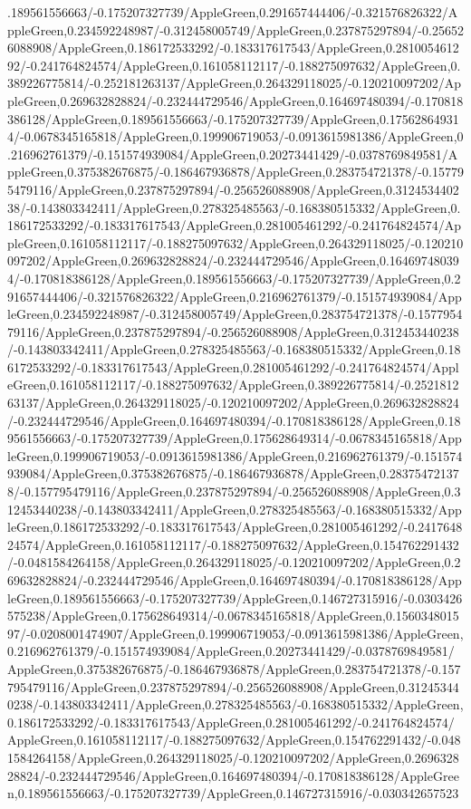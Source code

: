 {\begin{tikzternal}
{.189561556663/-0.175207327739/AppleGreen,0.291657444406/-0.321576826322/AppleGreen,0.234592248987/-0.312458005749/AppleGreen,0.237875297894/-0.256526088908/AppleGreen,0.186172533292/-0.183317617543/AppleGreen,0.281005461292/-0.241764824574/AppleGreen,0.161058112117/-0.188275097632/AppleGreen,0.389226775814/-0.252181263137/AppleGreen,0.264329118025/-0.120210097202/AppleGreen,0.269632828824/-0.232444729546/AppleGreen,0.164697480394/-0.170818386128/AppleGreen,0.189561556663/-0.175207327739/AppleGreen,0.175628649314/-0.0678345165818/AppleGreen,0.199906719053/-0.0913615981386/AppleGreen,0.216962761379/-0.151574939084/AppleGreen,0.20273441429/-0.0378769849581/AppleGreen,0.375382676875/-0.186467936878/AppleGreen,0.283754721378/-0.157795479116/AppleGreen,0.237875297894/-0.256526088908/AppleGreen,0.312453440238/-0.143803342411/AppleGreen,0.278325485563/-0.168380515332/AppleGreen,0.186172533292/-0.183317617543/AppleGreen,0.281005461292/-0.241764824574/AppleGreen,0.161058112117/-0.188275097632/AppleGreen,0.264329118025/-0.120210097202/AppleGreen,0.269632828824/-0.232444729546/AppleGreen,0.164697480394/-0.170818386128/AppleGreen,0.189561556663/-0.175207327739/AppleGreen,0.291657444406/-0.321576826322/AppleGreen,0.216962761379/-0.151574939084/AppleGreen,0.234592248987/-0.312458005749/AppleGreen,0.283754721378/-0.157795479116/AppleGreen,0.237875297894/-0.256526088908/AppleGreen,0.312453440238/-0.143803342411/AppleGreen,0.278325485563/-0.168380515332/AppleGreen,0.186172533292/-0.183317617543/AppleGreen,0.281005461292/-0.241764824574/AppleGreen,0.161058112117/-0.188275097632/AppleGreen,0.389226775814/-0.252181263137/AppleGreen,0.264329118025/-0.120210097202/AppleGreen,0.269632828824/-0.232444729546/AppleGreen,0.164697480394/-0.170818386128/AppleGreen,0.189561556663/-0.175207327739/AppleGreen,0.175628649314/-0.0678345165818/AppleGreen,0.199906719053/-0.0913615981386/AppleGreen,0.216962761379/-0.151574939084/AppleGreen,0.375382676875/-0.186467936878/AppleGreen,0.283754721378/-0.157795479116/AppleGreen,0.237875297894/-0.256526088908/AppleGreen,0.312453440238/-0.143803342411/AppleGreen,0.278325485563/-0.168380515332/AppleGreen,0.186172533292/-0.183317617543/AppleGreen,0.281005461292/-0.241764824574/AppleGreen,0.161058112117/-0.188275097632/AppleGreen,0.154762291432/-0.0481584264158/AppleGreen,0.264329118025/-0.120210097202/AppleGreen,0.269632828824/-0.232444729546/AppleGreen,0.164697480394/-0.170818386128/AppleGreen,0.189561556663/-0.175207327739/AppleGreen,0.146727315916/-0.0303426575238/AppleGreen,0.175628649314/-0.0678345165818/AppleGreen,0.156034801597/-0.0208001474907/AppleGreen,0.199906719053/-0.0913615981386/AppleGreen,0.216962761379/-0.151574939084/AppleGreen,0.20273441429/-0.0378769849581/AppleGreen,0.375382676875/-0.186467936878/AppleGreen,0.283754721378/-0.157795479116/AppleGreen,0.237875297894/-0.256526088908/AppleGreen,0.312453440238/-0.143803342411/AppleGreen,0.278325485563/-0.168380515332/AppleGreen,0.186172533292/-0.183317617543/AppleGreen,0.281005461292/-0.241764824574/AppleGreen,0.161058112117/-0.188275097632/AppleGreen,0.154762291432/-0.0481584264158/AppleGreen,0.264329118025/-0.120210097202/AppleGreen,0.269632828824/-0.232444729546/AppleGreen,0.164697480394/-0.170818386128/AppleGreen,0.189561556663/-0.175207327739/AppleGreen,0.146727315916/-0.030342657523}
\end{tikzternal}}

